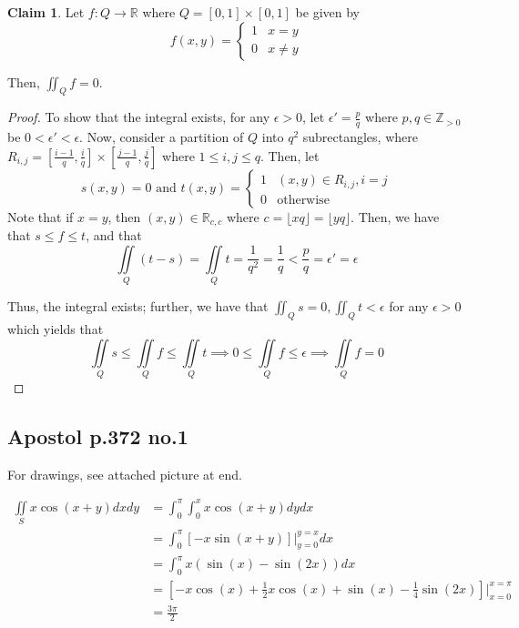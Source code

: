 \documentclass[12pt,letterpaper]{article}
\theoremstyle{definition}
\newtheorem*{claim}{Claim}
\newcommand{\R}{\mathbb{R}}
\newcommand{\Zg}{\mathbb{Z}_{>0}}
\begin{document}
\begin{claim}
  Let $f:  Q \rightarrow \R$ where $Q = [0,1]\times[0,1]$ be given by
  \[
    f(x,y) =
    \begin{cases}
      1 & x = y \\
      0 & x \neq y
    \end{cases}
  \]

  Then, $\iint_Qf = 0$.
\end{claim}

\begin{proof}
  To show that the integral exists, for any $\epsilon > 0$, let $\epsilon' =
  \frac{p}{q}$ where $p, q \in \Zg$ be $0 < \epsilon' < \epsilon$. Now, consider
  a partition of $Q$ into $q^2$ subrectangles, where $R_{i,j} = [\frac{i-1}{q}, \frac{i}{q}]
  \times [\frac{j-1}{q}, \frac{j}{q}]$ where $1 \leq i,j \leq q$. Then, let
  \[
    s(x,y) = 0 \text{ and }
    t(x,y) =
    \begin{cases}
      1 & (x,y) \in R_{i,j}, i = j \\
      0 & \text{otherwise}
    \end{cases}
  \]
  Note that if $x = y$, then $(x,y) \in \R_{c,c}$ where $c = \lfloor xq \rfloor
  = \lfloor yq \rfloor$. Then, we have that $s \leq f \leq t$, and that
  \[
    \iint\limits_Q (t-s) = \iint\limits_Qt = \frac{1}{q^2} = \frac{1}{q} <
    \frac{p}{q} = \epsilon' = \epsilon
  \]

  Thus, the integral exists; further, we have that $\iint_Q s = 0, \iint_Q t <
  \epsilon$ for any $\epsilon > 0$ which yields that
  \[
    \iint\limits_Q s \leq \iint\limits_Qf \leq \iint\limits_Qt \implies 0 \leq
    \iint\limits_Qf \leq \epsilon \implies \iint\limits_Qf = 0
  \]
\end{proof}

\subsection*{Apostol p.372 no.1}

For drawings, see attached picture at end.

\begin{align*}
  \iint\limits_Sx\cos(x+y)dxdy &= \int_0^\pi\int_0^xx\cos(x+y)dydx \\
                               &= \int_0^\pi\left[ -x\sin(x+y) \right]\Big|_{y=0}^{y=x}dx \\
                               &= \int_0^\pi x(\sin(x)-\sin(2x))dx \\
                               &= \left[ -x\cos(x) + \frac{1}{2}x\cos(x) + \sin(x) - \frac{1}{4}\sin(2x) \right]\Big|_{x=0}^{x=\pi} \\
                               &= \frac{3\pi}{2}
\end{align*}
\end{document}
